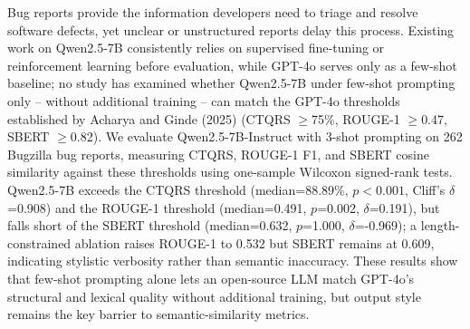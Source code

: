 Bug reports provide the information developers need to triage and resolve software defects, yet unclear or unstructured reports delay this process. Existing work on Qwen2.5-7B consistently relies on supervised fine-tuning or reinforcement learning before evaluation, while GPT-4o serves only as a few-shot baseline; no study has examined whether Qwen2.5-7B under few-shot prompting only -- without additional training -- can match the GPT-4o thresholds established by Acharya and Ginde (2025) (CTQRS $\geq$75\%, ROUGE-1 $\geq$0.47, SBERT $\geq$0.82). We evaluate Qwen2.5-7B-Instruct with 3-shot prompting on 262 Bugzilla bug reports, measuring CTQRS, ROUGE-1 F1, and SBERT cosine similarity against these thresholds using one-sample Wilcoxon signed-rank tests. Qwen2.5-7B exceeds the CTQRS threshold (median=88.89\%, $p<0.001$, Cliff's $\delta$=0.908) and the ROUGE-1 threshold (median=0.491, $p$=0.002, $\delta$=0.191), but falls short of the SBERT threshold (median=0.632, $p$=1.000, $\delta$=-0.969); a length-constrained ablation raises ROUGE-1 to 0.532 but SBERT remains at 0.609, indicating stylistic verbosity rather than semantic inaccuracy. These results show that few-shot prompting alone lets an open-source LLM match GPT-4o's structural and lexical quality without additional training, but output style remains the key barrier to semantic-similarity metrics.
